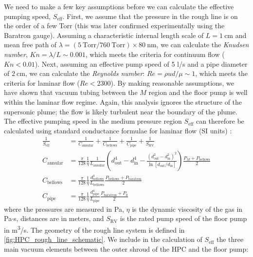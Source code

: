 We need to make a few key assumptions before we can calculate the effective pumping speed, $S_{\textrm{eff}}$. First, we assume that the pressure in the rough line is on the order of a few Torr (this was later confirmed experimentally using the Baratron gauge). Assuming a characteristic internal length scale of $L = 1 \ \textrm{cm}$ and mean free path of ${\lambda = (5 \ \textrm{Torr}/760 \ \textrm{Torr}) \times 80 \ \textrm{nm}}$, we can calculate the \textit{Knudsen number}, $Kn = \lambda / L \sim 0.001$, which meets the criteria for continuum flow ($Kn < 0.01$). Next, assuming an effective pump speed of 5 l/s and a pipe diameter of $2 \ \textrm{cm}$, we can calculate the \textit{Reynolds number}: $Re = \rho u d / \mu \sim 1$, which meets the criteria for laminar flow ($Re < 2300$). By making reasonable assumptions, we have shown that vacuum tubing between the $M$ region and the floor pump is well within the laminar flow regime. Again, this analysis ignores the structure of the supersonic plume; the flow is likely turbulent near the boundary of the plume. The effective pumping speed in the medium pressure region $S_{\textrm{eff}}$ can therefore be calculated using standard conductance formulae for laminar flow (SI units) \cite{joustenHandbookVacuumTechnology2016}:
\begin{equation}
\begin{aligned}
\frac{1}{S_{\textrm{eff}}} &= \frac{1}{C_{\textrm{annular}}} + \frac{1}{C_{\textrm{bellows}}} + \frac{1}{C_{\textrm{pipe}}} + \frac{1}{S_{\textrm{RV}}} \\
C_{\textrm{annular}} &= \frac{\pi}{128} \frac{1}{\eta} \frac{1}{L_{\textrm{annular}}} \left( d_{\textrm{out}}^4 - d_{\textrm{in}}^4 - \frac{(d_{\textrm{out}}^2 - d_{\textrm{in}}^2)^2}{\ln \left[d_{\textrm{out}}/d_{\textrm{in}}\right]} \right) \frac{P_M + P_{\textrm{bellows}}}{2} \\
C_{\textrm{bellows}} &= \frac{\pi}{128} \frac{1}{\eta} \frac{d_{\textrm{bellows}}^4}{L_{\textrm{bellows}}} \frac{P_{\textrm{bellows}} + P_{\textrm{baratron}}}{2} \\
C_{\textrm{pipe}} &= \frac{\pi}{128} \frac{1}{\eta} \frac{d_{\textrm{pipe}}^4}{L_{\textrm{pipe}}} \frac{P_{\textrm{baratron}} + P_0}{2}
\end{aligned}
\label{eqn:HPC-Seff-equations}
\end{equation}
where the pressures are measured in Pa, $\eta$ is the dynamic viscosity of the gas in Pa$\cdot$s, distances are in meters, and $S_{\textrm{RV}}$ is the rated pump speed of the floor pump in m\textsuperscript{3}/s. The geometry of the rough line system is defined in \cref{fig:HPC_rough_line_schematic}. We include in the calculation of $S_{\textrm{eff}}$ the three main vacuum elements between the outer shroud of the HPC and the floor pump:
